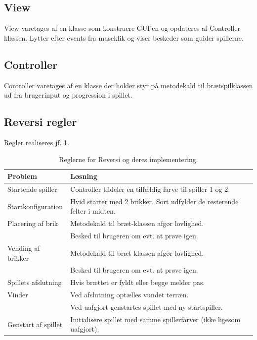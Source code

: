 \documentclass[a4paper, danish]{article}
\numberwithin{equation}{section}
\begin{document}
\subsection{View}
View varetages af en klasse som konstruere GUI'en og opdateres af Controller klassen. Lytter efter events fra museklik og viser beskeder som guider spillerne.
\subsection{Controller}
Controller varetages af en klasse der holder styr på metodekald til brætspilklassen ud fra brugerinput og progression i spillet.
\subsection{Reversi regler}
Regler realiseres jf. \cref{tbl:logik}.
\begin{table}[H]
    \centering
    \caption{Reglerne for Reversi og deres implementering.}\label{tbl:logik}
    \begin{tabular}{ll}
        \toprule
        Problem             & Løsning                                                                  \\
        \midrule
        Startende spiller   & Controller tildeler en tilfældig farve til spiller 1 og 2.               \\
        Startkonfiguration  & Hvid starter med 2 brikker. Sort udfylder de resterende felter i midten. \\
        Placering af brik   & Metodekald til bræt-klassen afgør lovlighed.                             \\
                            & Besked til brugeren om evt. at prøve igen.                               \\
        Vending af brikker  & Metodekald til bræt-klassen afgør lovlighed.                             \\
                            & Besked til brugeren om evt. at prøve igen.                               \\
        Spillets afslutning & Hvis brættet er fyldt eller begge melder pas.                            \\
        Vinder              & Ved afslutning optælles vundet terræn.                                   \\
                            & Ved uafgjort genstartes spillet med ny startspiller.                     \\
        Genstart af spillet & Initialisere spillet med samme spillerfarver (ikke ligesom uafgjort).    \\
        \bottomrule
    \end{tabular}
\end{table}
\end{document}

